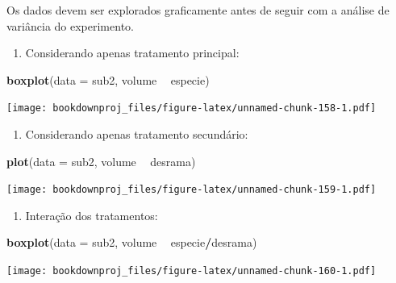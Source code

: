 \documentclass[
]{article}
\newenvironment{Shaded}{\begin{snugshade}}{\end{snugshade}}
\newcommand{\DataTypeTok}[1]{\textcolor[rgb]{0.13,0.29,0.53}{#1}}
\newcommand{\KeywordTok}[1]{\textcolor[rgb]{0.13,0.29,0.53}{\textbf{#1}}}
\newcommand{\NormalTok}[1]{#1}
\newcommand{\OperatorTok}[1]{\textcolor[rgb]{0.81,0.36,0.00}{\textbf{#1}}}
\newcommand{\StringTok}[1]{\textcolor[rgb]{0.31,0.60,0.02}{#1}}
\providecommand{\tightlist}{%
  \setlength{\itemsep}{0pt}\setlength{\parskip}{0pt}}
\begin{document}
Os dados devem ser explorados graficamente antes de seguir com a análise de variância do experimento.

\begin{enumerate}
\def\labelenumi{\arabic{enumi}.}
\tightlist
\item
  Considerando apenas tratamento principal:
\end{enumerate}

\begin{Shaded}
\begin{Highlighting}[]
\KeywordTok{boxplot}\NormalTok{(}\DataTypeTok{data =}\NormalTok{ sub2, volume }\OperatorTok{~}\StringTok{ }\NormalTok{especie)}
\end{Highlighting}
\end{Shaded}

\texttt{[image: bookdownproj\_files/figure-latex/unnamed-chunk-158-1.pdf]}

\begin{enumerate}
\def\labelenumi{\arabic{enumi}.}
\setcounter{enumi}{1}
\tightlist
\item
  Considerando apenas tratamento secundário:
\end{enumerate}

\begin{Shaded}
\begin{Highlighting}[]
\KeywordTok{plot}\NormalTok{(}\DataTypeTok{data =}\NormalTok{ sub2, volume }\OperatorTok{~}\StringTok{ }\NormalTok{desrama)}
\end{Highlighting}
\end{Shaded}

\texttt{[image: bookdownproj\_files/figure-latex/unnamed-chunk-159-1.pdf]}

\begin{enumerate}
\def\labelenumi{\arabic{enumi}.}
\setcounter{enumi}{2}
\tightlist
\item
  Interação dos tratamentos:
\end{enumerate}

\begin{Shaded}
\begin{Highlighting}[]
\KeywordTok{boxplot}\NormalTok{(}\DataTypeTok{data =}\NormalTok{ sub2, volume }\OperatorTok{~}\StringTok{ }\NormalTok{especie}\OperatorTok{/}\NormalTok{desrama)}
\end{Highlighting}
\end{Shaded}

\texttt{[image: bookdownproj\_files/figure-latex/unnamed-chunk-160-1.pdf]}
\end{document}

